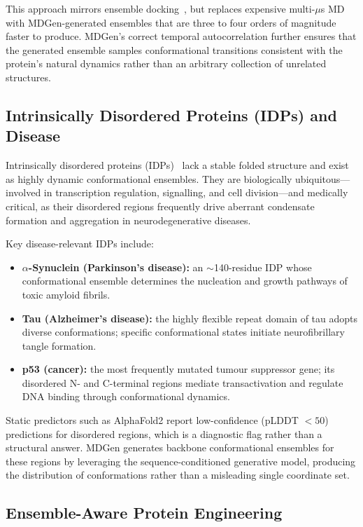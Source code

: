 \documentclass[11pt,a4paper]{article}
\begin{document}
This approach mirrors ensemble docking~\cite{totrov2008}, but replaces expensive multi-$\mu$s MD
with MDGen-generated ensembles that are three to four orders of magnitude faster to produce.
MDGen's correct temporal autocorrelation further ensures that the generated ensemble samples
conformational transitions consistent with the protein's natural dynamics rather than an arbitrary
collection of unrelated structures.

\subsection{Intrinsically Disordered Proteins (IDPs) and Disease}

Intrinsically disordered proteins (IDPs)~\cite{uversky2019} lack a stable folded structure and
exist as highly dynamic conformational ensembles.  They are biologically ubiquitous---involved in
transcription regulation, signalling, and cell division---and medically critical, as their
disordered regions frequently drive aberrant condensate formation and aggregation in
neurodegenerative diseases.

Key disease-relevant IDPs include:
\begin{itemize}[leftmargin=2em]
  \item \textbf{$\alpha$-Synuclein (Parkinson's disease):} an $\sim$140-residue IDP whose
    conformational ensemble determines the nucleation and growth pathways of toxic amyloid fibrils.
  \item \textbf{Tau (Alzheimer's disease):} the highly flexible repeat domain of tau adopts diverse
    conformations; specific conformational states initiate neurofibrillary tangle formation.
  \item \textbf{p53 (cancer):} the most frequently mutated tumour suppressor gene; its disordered
    N- and C-terminal regions mediate transactivation and regulate DNA binding through
    conformational dynamics.
\end{itemize}

Static predictors such as AlphaFold2 report low-confidence (pLDDT $< 50$) predictions for
disordered regions, which is a diagnostic flag rather than a structural answer.  MDGen generates
backbone conformational ensembles for these regions by leveraging the sequence-conditioned
generative model, producing the distribution of conformations rather than a misleading single
coordinate set.

\subsection{Ensemble-Aware Protein Engineering}
\end{document}
